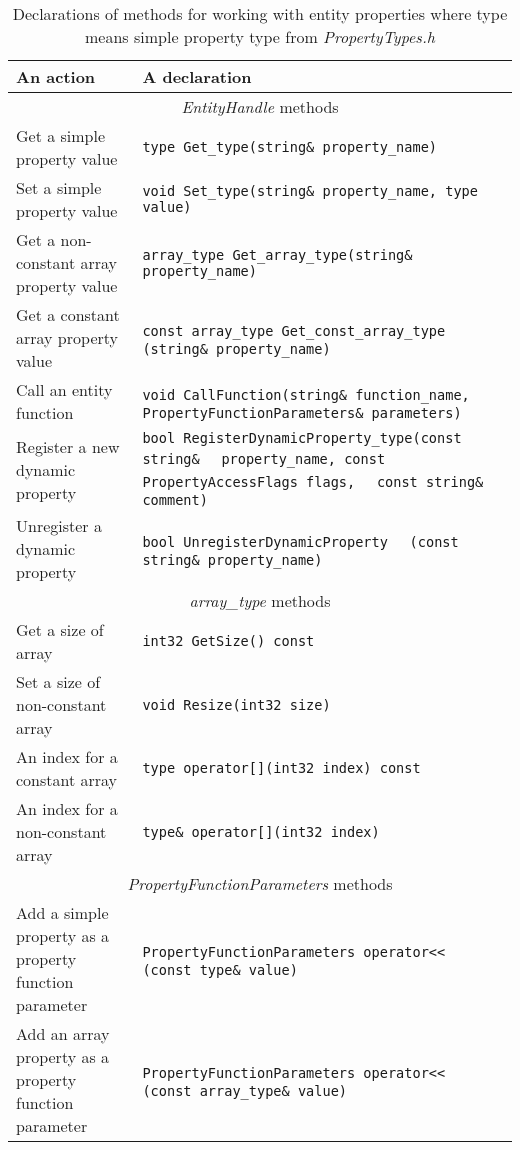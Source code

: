 \begin{table}[htbp]
	\centering
		{\scriptsize 
		\begin{tabular}{|p{0.38\hsize}|p{0.55\hsize}|}
			\hline
			An action & A declaration\\
			\hline
			\multicolumn{2}{|c|}{\emph{EntityHandle} methods}\\
			\hline
			Get a simple property value & \verb/type Get_type(string& property_name)/\\
			Set a simple property value & \verb/void Set_type(string& property_name, type value)/\\
			Get a non-constant array property value & \verb/array_type Get_array_type(string& property_name)/\\
			Get a constant array property value & \verb/const array_type Get_const_array_type/ \verb/  (string& property_name)/\\
			Call an entity function & \verb/void CallFunction(string& function_name,/ \verb/  PropertyFunctionParameters& parameters)/\\
			Register a new dynamic property & \verb/bool RegisterDynamicProperty_type(const string&/ \verb/  property_name, const PropertyAccessFlags flags,/ \verb/  const string& comment)/\\
			Unregister a dynamic property & \verb/bool UnregisterDynamicProperty/ \verb/  (const string& property_name)/\\
			\hline
			\multicolumn{2}{|c|}{\emph{array\_type} methods}\\
			\hline
			Get a size of array & \verb/int32 GetSize() const/\\
			Set a size of non-constant array & \verb/void Resize(int32 size)/\\
			An index for a constant array & \verb/type operator[](int32 index) const/\\
			An index for a non-constant array & \verb/type& operator[](int32 index)/\\
			\hline
			\multicolumn{2}{|c|}{\emph{PropertyFunctionParameters} methods}\\
			\hline
			Add a simple property as a property function parameter & \verb/PropertyFunctionParameters operator<</ \verb/  (const type& value)/\\
			Add an array property as a property function parameter & \verb/PropertyFunctionParameters operator<</ \verb/  (const array_type& value)/\\
			\hline
		\end{tabular}
		}
	\caption[Working with entity properties]{Declarations of methods for working with entity properties where type means simple property type from \emph{PropertyTypes.h}}
	\label{tab:script-properties}
\end{table}

